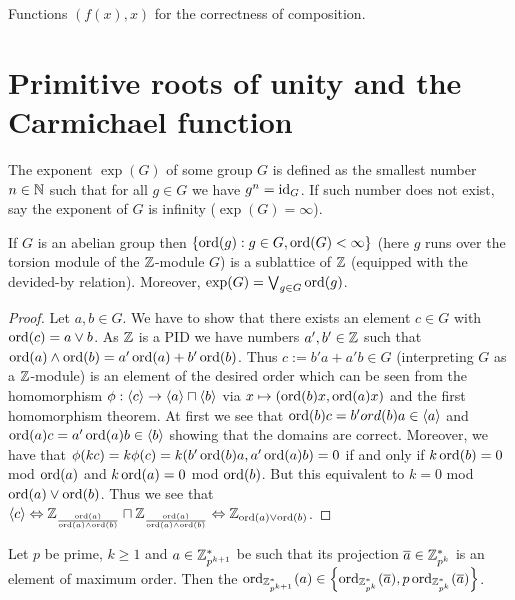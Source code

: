 \documentclass[8pt,a4paper]{article}
\begin{document}
Functions $(f(x),x)$ for the correctness of composition.

\section{Primitive roots of unity and the Carmichael function}

\begin{definition}
    The exponent $\exp(G)$ of some group $G$ is defined as the smallest number $n\in\mathbb{N}$ such that for all $g\in G$ we have $g^n=\mathop{\mathrm{id}}\nolimits_G$. If such number does not exist, say the exponent of $G$ is infinity ($\exp(G)=\infty$).
\end{definition}

\begin{lemma}
    If $G$ is an abelian group then $\{\mathop\mathrm{ord}(g):g\in G, \mathop\mathrm{ord}(G)<\infty\}$ (here $g$ runs over the torsion module of the $\mathbb{Z}$-module $G$) is a sublattice of $\mathbb{Z}$ (equipped with the devided-by relation). Moreover, $\exp(G)=\mathop\mathrm{\bigvee}_{g\in G}{\mathop\mathrm{ord}(g)}$.
\end{lemma}

\begin{proof}
    Let $a,b\in G$. We have to show that there exists an element $c\in G$ with $\mathop\mathrm{ord}(c)=a\vee b$. As $\mathbb{Z}$ is a PID we have numbers $a',b'\in\mathbb{Z}$ such that $\mathop\mathrm{ord}(a)\wedge\mathop\mathrm{ord}(b)=a'\mathop\mathrm{ord}(a)+b'\mathop\mathrm{ord}(b)$. Thus $c:=b'a+a'b\in G$ (interpreting $G$ as a $\mathbb{Z}$-module) is an element of the desired order which can be seen from the homomorphism $\phi:\gen{c}\to \gen{a}\times\gen{b}$ via $x\mapsto (\mathop\mathrm{ord}(b)x,\mathop\mathrm{ord}(a)x)$ and the first homomorphism theorem.
    At first we see that $\ord(b)c=b'ord(b)a\in\gen{a}$ and $\ord(a)c=a'\ord(a)b\in\gen{b}$ showing that the domains are correct.
    Moreover, we have that $\phi(kc)=k\phi(c)=k(b'\mathop\mathrm{ord}(b)a,a'\mathop\mathrm{ord}(a)b)=0$ if and only if $k\mathop\mathrm{ord}(b)=0$ mod $\mathop\mathrm{ord}(a)$ and $k\mathop\mathrm{ord}(a)=0$ mod $\mathop\mathrm{ord}(b)$. But this equivalent to $k=0$ mod $\mathop\mathrm{ord}(a)\vee\mathop\mathrm{ord}(b)$. Thus we see that $\gen{c} \iso  \ints_{\frac{\ord(a)}{\ord(a)\meet\ord(b)}}\times\ints_{\frac{\ord(a)}{\ord(a)\meet\ord(b)}} \iso \ints_{\ord(a)\join\ord(b)}$.
\end{proof}

\begin{lemma}
    Let $p$ be prime, $k\geq 1$ and $a\in\mathbb{Z}^*_{p^{k+1}}$ be such that its projection $\overline{a}\in\mathbb{Z}^*_{p^k}$ is an element of maximum order. Then the $\ord_{\ints^*_{p^{k+1}}}(a)\in\set{\ord_{\ints^*_{p^k}}(\bar{a}),p\ord_{\ints^*_{p^k}}(\bar{a})}$.
\end{lemma}
\end{document}
